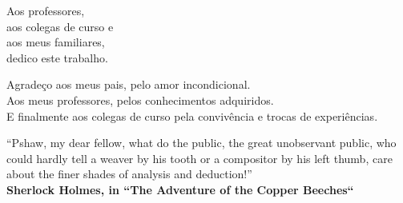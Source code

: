 



\pretextualchapter{}
\vspace{8cm}
\begin{flushright}
\hfill \textnormal{
Aos professores, \\
aos colegas de curso e \\
aos meus familiares, \\
dedico este trabalho.}
\end{flushright}




\begin{minipage}{\textwidth}
    Agradeço aos meus pais, pelo amor incondicional. \\
    Aos meus professores, pelos conhecimentos adquiridos. \\
     E finalmente aos colegas de curso pela convivência e trocas de experiências.
\end{minipage}


\pretextualchapter{}
\vspace{8cm}
\begin{flushright}
\textnormal{``Pshaw, my dear fellow, what do the public, the great unobservant public, who could hardly tell a weaver by his tooth or a compositor by his left thumb, care about the finer shades of analysis and deduction!'' \\
	\bfseries Sherlock Holmes, in ``The Adventure of the Copper Beeches``}
\end{flushright}

